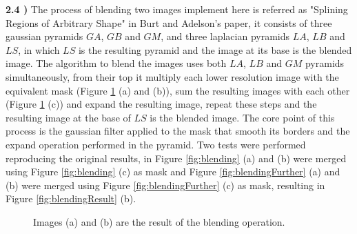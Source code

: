 \documentclass[12pt,a4paper]{article}
\begin{document}
\textbf{2.4 )} The process of blending two images implement here is referred as "Splining Regions of Arbitrary Shape" in Burt and Adelson's paper, it consists of three gaussian pyramids $GA$, $GB$ and $GM$, and three laplacian pyramids $LA$, $LB$ and $LS$, in which $LS$ is the resulting pyramid and the image at its base is the blended image. The algorithm to blend the images uses both $LA$, $LB$ and $GM$ pyramids simultaneously, from their top it multiply each lower resolution image with the equivalent mask (Figure \ref{fig:blendingProcess} (a) and (b)), sum the resulting images with each other (Figure \ref{fig:blendingProcess} (c)) and expand the resulting image, repeat these steps and the resulting image at the base of $LS$ is the blended image. The core point of this process is the gaussian filter applied to the mask that smooth its borders and the expand operation performed in the pyramid. Two tests were performed reproducing the original results, in Figure \ref{fig:blending} (a) and (b) were merged using Figure \ref{fig:blending} (c) as mask and Figure \ref{fig:blendingFurther} (a) and (b) were merged using Figure \ref{fig:blendingFurther} (c) as mask, resulting in Figure \ref{fig:blendingResult} (b).

\begin{figure}[!h]
	\centering
	\quad
	\quad
	\caption{Images (a) and (b) are the result of the blending operation.}
	\label{fig:blendingProcess}
\end{figure}
\end{document}
